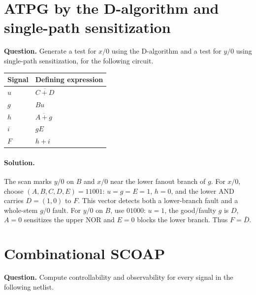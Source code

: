 \documentclass[11pt]{article}
\newcommand{\sol}{\paragraph{Solution.}}
\begin{document}
\section{ATPG by the D-algorithm and single-path sensitization}
\textbf{Question.} Generate a test for $x/0$ using the D-algorithm and a test
for $y/0$ using single-path sensitization, for the following circuit.
\begin{center}\begin{tabular}{ll}\toprule Signal & Defining expression\\\midrule
$u$ & $\overline{C+D}$\\
$g$ & $Bu$\\
$h$ & $\overline{A+g}$\\
$i$ & $gE$\\
$F$ & $h+i$\\
\bottomrule\end{tabular}\end{center}
\begin{center}\end{center}
\sol The scan marks $y/0$ on $B$ and $x/0$ near the lower fanout
branch of $g$. For $x/0$, choose $(A,B,C,D,E)=11001$:
$u=g=E=1$, $h=0$, and the lower AND carries $D=(1,0)$ to $F$.
This vector detects both a lower-branch fault and a whole-stem $g/0$ fault.
For $y/0$ on $B$, use $01000$: $u=1$, the good/faulty $g$ is $D$,
$A=0$ sensitizes the upper NOR and $E=0$ blocks the lower branch.
Thus $F=\bar D$.\section{Combinational SCOAP}
\textbf{Question.} Compute controllability and observability for every signal in the following netlist.
\end{document}
